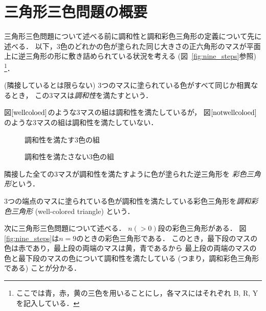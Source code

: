 \section{三角形三色問題の概要}
三角形三色問題について述べる前に調和性と調和彩色三角形の定義について先に述べる．
以下，$3$色のどれかの色が塗られた同じ大きさの正六角形のマスが平面上に逆三角形の形に敷き詰められている状況を考える (図~\ref{fig:nine_steps}参照)
\footnote{
  ここでは青，赤，黄の三色を用いることにし，各マスにはそれぞれ B, R, Y を記入している．
}．

\begin{dfn}[調和性] \label{dfn:wc}\rm
  (隣接しているとは限らない) $3$つのマスに塗られている色がすべて同じか相異なるとき，
  この$3$マスは{\em 調和性}を満たすという．
\end{dfn}

\begin{exm}
  図$\ref{wellcoloed}$のような$3$マスの組は調和性を満たしているが，
  図$\ref{notwellcoloed}$のような$3$マスの組は調和性を満たしていない．
  \begin{figure}[h]
    \centering
    
    \caption{調和性を満たす$3$色の組}
    \label{wellcoloed}
  \end{figure}
  \begin{figure}[h]
    \centering
    
    \caption{調和性を満たさない$3$色の組}
    \label{notwellcoloed}
  \end{figure}
\end{exm}

\begin{dfn}[彩色三角形] \label{dfn:three_tri}\rm
  隣接した全ての$3$マスが調和性を満たすように色が塗られた逆三角形を
  {\em 彩色三角形}という．
\end{dfn}

\begin{dfn}[調和彩色三角形] \label{dfn:wc_tri}\rm
  $3$つの端点のマスに塗られている色が調和性を満たしている彩色三角形を{\em 調和彩色三角形} (well-colored triangle) という．
\end{dfn}

次に三角形三色問題について述べる．
  $n(>0)$段の彩色三角形がある．
  図\ref{fig:nine_steps}は$n=9$のときの彩色三角形である．
  このとき，最下段のマスの色は赤であり，最上段の両端のマスは黄，青であるから
  最上段の両端のマスの色と最下段のマスの色について調和性を満たしている (つまり，調和彩色三角形である) ことが分かる．

